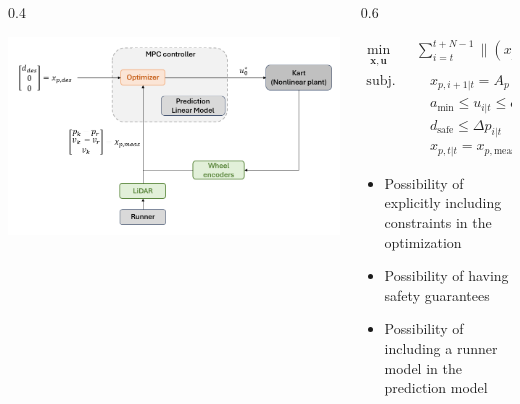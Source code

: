 \documentclass[9pt, aspectratio=169]{beamer}
\begin{document}
\begin{frame}
\begin{columns}
\begin{column}{0.4\textwidth}
	\begin{center}
  		\includegraphics[width=1.2\textwidth]{MPC_scheme} 
	\end{center}
\end{column}

\begin{column}{0.6\textwidth}

\begin{equation*}
\begin{alignedat}{2}
	\min_{\substack{\boldsymbol{x}, \boldsymbol{u}}}\quad &\sum_{i=t}^{t+N-1} \|(x_{p,i|t} - x_{p,\text{des}})\|_Q \, +  \|u_{i|t}\|_R &&   \\
	\text{subj. to} & \quad x_{p,i+1|t}  = A_p \, x_{p,i|t} + B_p \, u_{i|t} + a_t  && \\
    &\quad a_{\text{min}} \leq u_{i|t} \leq a_{\text{max}}&& \\
    &\quad d_{\text{safe}}\leq \Delta p_{i|t} &&  \\
    &\quad x_{p,t|t} = x_{p,\text{meas}} &&
\end{alignedat}
\end{equation*}

\begin{block}{}
\begin{itemize}
\vspace{0.1cm}
\footnotesize
	\item[$\blacktriangleright$] Possibility of explicitly including constraints in the optimization
	\item[$\blacktriangleright$] Possibility of having safety guarantees
	\item[$\blacktriangleright$] Possibility of including a runner model in the prediction model
\end{itemize}
\end{block}
\end{column}
\end{columns}





\end{frame}
\end{document}
